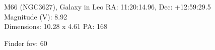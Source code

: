\begin{block}{M66 (NGC3627), Galaxy in Leo}
    RA: 11:20:14.96, Dec: +12:59:29.5 \\ 
    Magnitude (V): 8.92 \\ 
    Dimensions: 10.28 x 4.61 PA: 168 

    Finder fov: 60 
\end{block}
